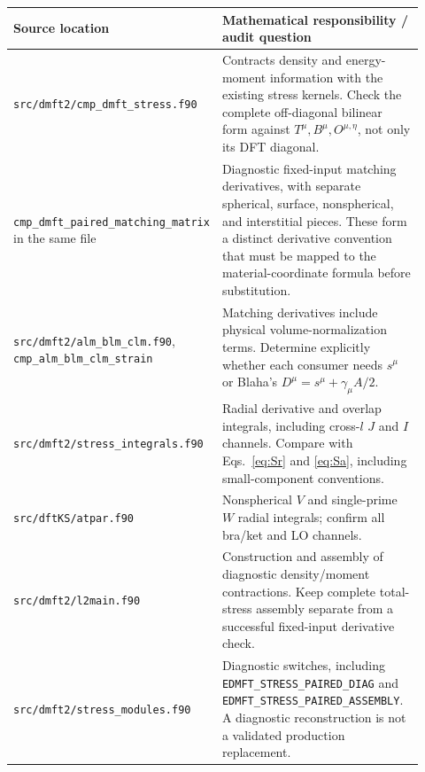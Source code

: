 \documentclass[11pt]{article}
\newcommand{\pathf}[1]{\nolinkurl{#1}}
\begin{document}
\begin{longtable}{>{\raggedright\arraybackslash}p{0.36\linewidth}p{0.56\linewidth}}
\toprule
Source location & Mathematical responsibility / audit question\\
\midrule
\pathf{src/dmft2/cmp_dmft_stress.f90}
 & Contracts density and energy-moment information with the existing
 stress kernels. Check the complete off-diagonal bilinear form against
 $T^\mu,B^\mu,O^{\mu,\eta}$, not only its DFT diagonal.\\
\pathf{cmp_dmft_paired_matching_matrix}
 in the same file & Diagnostic fixed-input matching derivatives,
 with separate spherical, surface, nonspherical, and interstitial
 pieces. These form a distinct derivative convention that must be
 mapped to the material-coordinate formula before substitution.\\
\pathf{src/dmft2/alm_blm_clm.f90},
 \pathf{cmp_alm_blm_clm_strain}
 & Matching derivatives include physical volume-normalization terms.
 Determine explicitly whether each consumer needs $s^\mu$ or Blaha's
 $D^\mu=s^\mu+\gamma_\mu A/2$.\\
\pathf{src/dmft2/stress_integrals.f90}
 & Radial derivative and overlap integrals, including cross-$l$
 $J$ and $I$ channels. Compare with Eqs.~\eqref{eq:Sr} and
 \eqref{eq:Sa}, including small-component conventions.\\
\pathf{src/dftKS/atpar.f90}
 & Nonspherical $V$ and single-prime $W$ radial integrals;
 confirm all bra/ket and LO channels.\\
\pathf{src/dmft2/l2main.f90}
 & Construction and assembly of diagnostic density/moment contractions.
 Keep complete total-stress assembly separate from a successful
 fixed-input derivative check.\\
\pathf{src/dmft2/stress_modules.f90}
 & Diagnostic switches, including
 \pathf{EDMFT_STRESS_PAIRED_DIAG} and
 \pathf{EDMFT_STRESS_PAIRED_ASSEMBLY}. A diagnostic reconstruction
 is not a validated production replacement.\\
\bottomrule
\end{longtable}
\end{document}
